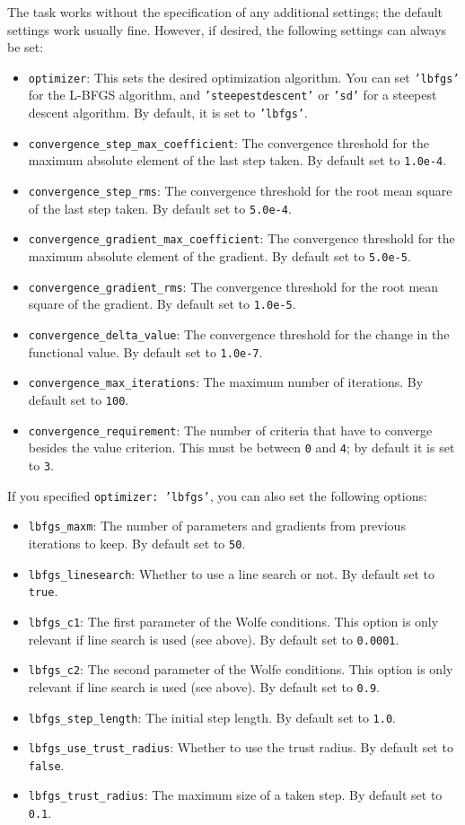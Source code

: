 \documentclass[]{tufte-book}
\begin{document}
The task works without the specification of any additional settings; the default settings work usually fine. However,
if desired, the following settings can always be set:
\begin{itemize}
\item \texttt{optimizer}: This sets the desired optimization algorithm. You can set \texttt{'lbfgs'} for the L-BFGS algorithm, and
\texttt{'steepestdescent'} or \texttt{'sd'} for a steepest descent algorithm. By default, it is set to \texttt{'lbfgs'}.
\item \texttt{convergence\_step\_max\_coefficient}: The convergence threshold for the maximum absolute element of the last step taken.
By default set to \texttt{1.0e-4}.
\item \texttt{convergence\_step\_rms}: The convergence threshold for the root mean square of the last step taken. By default set to 
\texttt{5.0e-4}.
\item \texttt{convergence\_gradient\_max\_coefficient}: The convergence threshold for the maximum absolute element of the gradient. 
By default set to \texttt{5.0e-5}.
\item \texttt{convergence\_gradient\_rms}: The convergence threshold for the root mean square of the gradient. By default set to 
\texttt{1.0e-5}.
\item \texttt{convergence\_delta\_value}: The convergence threshold for the change in the functional value. By default set to
\texttt{1.0e-7}.
\item \texttt{convergence\_max\_iterations}: The maximum number of iterations. By default set to \texttt{100}.
\item \texttt{convergence\_requirement}: The number of criteria that have to converge besides the value criterion. This 
must be between \texttt{0} and \texttt{4}; by default it is set to \texttt{3}.
\end{itemize}

If you specified \texttt{optimizer: 'lbfgs'}, you can also set the following options:
\begin{itemize}
\item \texttt{lbfgs\_maxm}: The number of parameters and gradients from previous iterations to keep. By default set to 
\texttt{50}.
\item \texttt{lbfgs\_linesearch}: Whether to use a line search or not. By default set to \texttt{true}.
\item \texttt{lbfgs\_c1}: The first parameter of the Wolfe conditions. This option is only relevant if line search is
used (see above). By default set to \texttt{0.0001}.
\item \texttt{lbfgs\_c2}:  The second parameter of the Wolfe conditions. This option is only relevant if line search is
used (see above). By default set to \texttt{0.9}.
\item \texttt{lbfgs\_step\_length}: The initial step length. By default set to \texttt{1.0}.
\item \texttt{lbfgs\_use\_trust\_radius}: Whether to use the trust radius. By default set to \texttt{false}.
\item \texttt{lbfgs\_trust\_radius}: The maximum size of a taken step. By default set to \texttt{0.1}.
\end{itemize}
\end{document}
